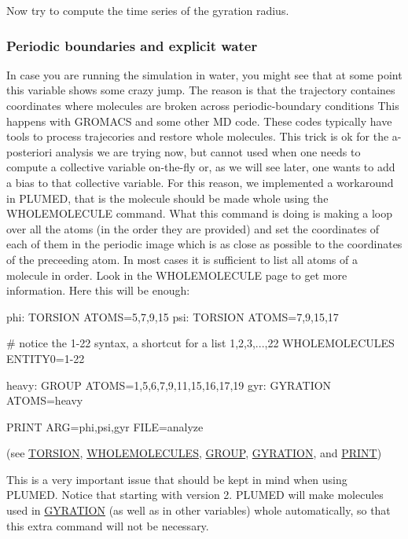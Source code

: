 Now try to compute the time series of the gyration radius.



 \hypertarget{munster_munster-monitor-pbc}{}\subsubsection{Periodic boundaries and explicit water}\label{munster_munster-monitor-pbc}
In case you are running the simulation in water, you might see that at some point this variable shows some crazy jump. The reason is that the trajectory containes coordinates where molecules are broken across periodic-\/boundary conditions This happens with G\+R\+O\+M\+A\+C\+S and some other M\+D code. These codes typically have tools to process trajecories and restore whole molecules. This trick is ok for the a-\/posteriori analysis we are trying now, but cannot used when one needs to compute a collective variable on-\/the-\/fly or, as we will see later, one wants to add a bias to that collective variable. For this reason, we implemented a workaround in P\+L\+U\+M\+E\+D, that is the molecule should be made whole using the W\+H\+O\+L\+E\+M\+O\+L\+E\+C\+U\+L\+E command. What this command is doing is making a loop over all the atoms (in the order they are provided) and set the coordinates of each of them in the periodic image which is as close as possible to the coordinates of the preceeding atom. In most cases it is sufficient to list all atoms of a molecule in order. Look in the W\+H\+O\+L\+E\+M\+O\+L\+E\+C\+U\+L\+E page to get more information. Here this will be enough\+: \begin{DoxyVerb}phi: TORSION ATOMS=5,7,9,15
psi: TORSION ATOMS=7,9,15,17

# notice the 1-22 syntax, a shortcut for a list 1,2,3,...,22
WHOLEMOLECULES ENTITY0=1-22

heavy: GROUP ATOMS=1,5,6,7,9,11,15,16,17,19
gyr: GYRATION ATOMS=heavy

PRINT ARG=phi,psi,gyr FILE=analyze
\end{DoxyVerb}
 (see \hyperlink{TORSION}{T\+O\+R\+S\+I\+O\+N}, \hyperlink{WHOLEMOLECULES}{W\+H\+O\+L\+E\+M\+O\+L\+E\+C\+U\+L\+E\+S}, \hyperlink{GROUP}{G\+R\+O\+U\+P}, \hyperlink{GYRATION}{G\+Y\+R\+A\+T\+I\+O\+N}, and \hyperlink{PRINT}{P\+R\+I\+N\+T})

This is a very important issue that should be kept in mind when using P\+L\+U\+M\+E\+D. Notice that starting with version 2. P\+L\+U\+M\+E\+D will make molecules used in \hyperlink{GYRATION}{G\+Y\+R\+A\+T\+I\+O\+N} (as well as in other variables) whole automatically, so that this extra command will not be necessary.

